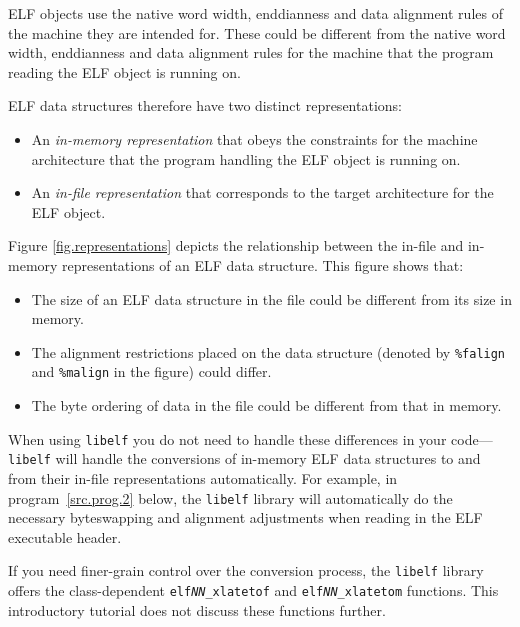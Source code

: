 \documentclass[a4paper,pdftex]{book}
\newcommand{\code}[1]{\texttt{#1}}
\newcommand{\library}[1]{\texttt{#1}}
\begin{document}
ELF objects use the native word width, enddianness and data alignment
rules of the machine they are intended for.  These could be different
from the native word width, enddianness and data alignment rules for
the machine that the program reading the ELF object is running on.

ELF data structures therefore have two distinct
representations:

\begin{itemize}
\item An \emph{in-memory representation} that obeys the constraints
  for the machine architecture that the program handling the ELF
  object is running on.
\item An \emph{in-file representation} that corresponds to the target
  architecture for the ELF object.
\end{itemize}

Figure \vref{fig.representations} depicts the relationship between the
in-file and in-memory representations of an ELF data structure.  This
figure shows that:

\begin{itemize}
\item The size of an ELF data structure in the file could be different
  from its size in memory.
\item The alignment restrictions placed on the data structure (denoted
  by \code{\%falign} and \code{\%malign} in the figure)
  could differ.
\item The byte ordering of data in the file could be different
  from that in memory.
\end{itemize}

When using \library{libelf} you do not need to handle these
differences in your code---\library{libelf} will handle the
conversions of in-memory ELF data structures to and from their in-file
representations automatically.  For example, in
program~\ref{src.prog.2} below, the \library{libelf} library will
automatically do the necessary byteswapping and alignment adjustments
when reading in the ELF executable header.%
%

If you need finer-grain control over the conversion process, the
\library{libelf} library offers the class-dependent
\code{elf\textit{NN}\_xlatetof} and \code{elf\textit{NN}\_xlatetom}
functions. This
introductory tutorial does not discuss these functions further.
\end{document}
